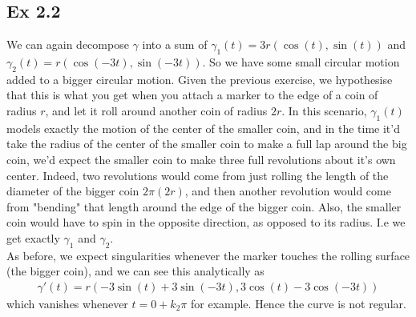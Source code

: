 \documentclass{article}
\theoremstyle{definition}
\begin{document}
\subsection*{Ex 2.2}

We can again decompose $\gamma$ into a sum of $\gamma_1(t) = 3r(\cos(t),
\sin(t))$ and $\gamma_2(t) = r(\cos(-3t), \sin(-3t))$. So we have some small
circular motion added to a bigger circular motion. Given the previous exercise,
we hypothesise that this is what you get when you attach a marker to the edge
of a coin of radius $r$, and let it roll around another coin of radius $2r$. In
this scenario, $\gamma_1(t)$ models exactly the motion of the center of the
smaller coin, and in the time it'd take the radius of the center of the smaller
coin to make a full lap around the big coin, we'd expect the smaller coin to
make three full revolutions about it's own center. Indeed, two revolutions
would come from just rolling the length of the diameter of the bigger coin
$2\pi (2r)$, and then another revolution would come from "bending" that length
around the edge of the bigger coin. Also, the smaller coin would have to spin
in the opposite direction, as opposed to its radius. I.e we get exactly
$\gamma_1$ and $\gamma_2$. \\

As before, we expect singularities whenever the marker touches the rolling
surface (the bigger coin), and we can see this analytically as 
\begin{align*}
	\gamma'(t)
	=
	r(-3\sin(t) + 3\sin(-3t), 3\cos(t) - 3\cos(-3t))
\end{align*}
which vanishes whenever $t = 0 + k_2\pi$ for example. Hence the curve is not
regular. \\
\end{document}
